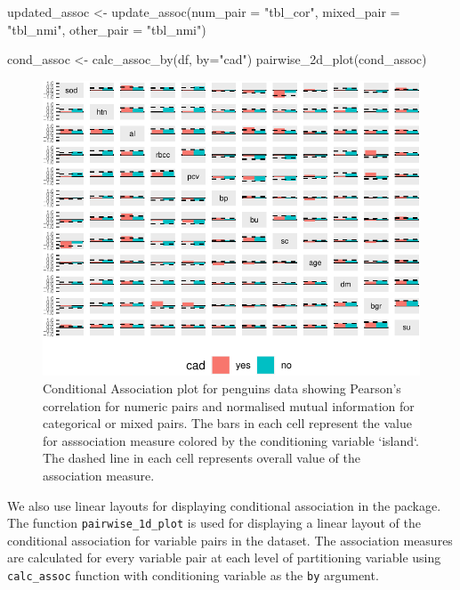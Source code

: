 \begin{Schunk}
\begin{Sinput}
updated_assoc <- update_assoc(num_pair = "tbl_cor",
                              mixed_pair = "tbl_nmi",
                              other_pair = "tbl_nmi")

cond_assoc <- calc_assoc_by(df, by="cad")
pairwise_2d_plot(cond_assoc)
\end{Sinput}
\begin{figure}

{\centering \includegraphics{rj_paper_files/figure-latex/cond-assoc-1} 

}

\caption[Conditional Association plot for penguins data showing Pearson's correlation for numeric pairs and normalised mutual information for categorical or mixed pairs]{Conditional Association plot for penguins data showing Pearson's correlation for numeric pairs and normalised mutual information for categorical or mixed pairs. The bars in each cell represent the value for asssociation measure colored by the conditioning variable `island`. The dashed line in each cell represents overall value of the association measure.}\label{fig:cond-assoc}
\end{figure}
\end{Schunk}

We also use linear layouts for displaying conditional association in the
package. The function \texttt{pairwise\_1d\_plot} is used for displaying
a linear layout of the conditional association for variable pairs in the
dataset. The association measures are calculated for every variable pair
at each level of partitioning variable using \texttt{calc\_assoc}
function with conditioning variable as the \texttt{by} argument.

